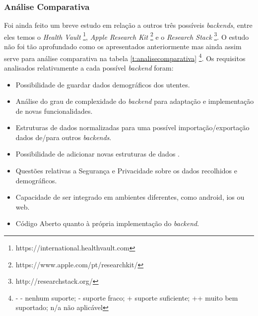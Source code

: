 \subsubsection{Análise Comparativa}
Foi ainda feito um breve estudo em relação a outros três possíveis \textit{backends}, entre eles temos o \textit{Health Vault} \footnote{https://international.healthvault.com}, \textit{Apple Research Kit} \footnote{https://www.apple.com/pt/researchkit/} e o \textit{Research Stack} \footnote{http://researchstack.org/}. O estudo não foi tão aprofundado como os apresentados anteriormente mas ainda assim serve para análise comparativa na tabela \ref{t:analisecomparativa} \footnote{ - - nenhum suporte; - suporte fraco; + suporte suficiente; ++ muito bem suportado; n/a não aplicável}. Os requisitos analisados relativamente a cada possível \textit{backend} foram: 
\begin{itemize}
  \item Possibilidade de guardar dados demográficos dos utentes.
  \item Análise do grau de complexidade  do \textit{backend} para adaptação e implementação de novas funcionalidades.
  \item Estruturas de dados normalizadas para uma possível importação/exportação dados de/para outros \textit{backends}.
  \item Possibilidade de adicionar novas estruturas de dados .
  \item Questões relativas a Segurança e Privacidade sobre os dados recolhidos e demográficos.
  \item Capacidade de ser integrado em ambientes diferentes, como android, ios ou web.
  \item Código Aberto quanto à própria implementação do \textit{backend}.
\end{itemize}

